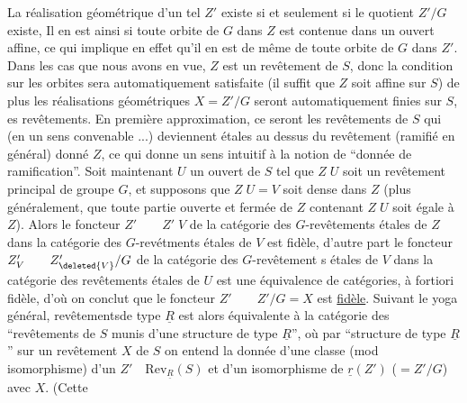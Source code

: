 La réalisation géométrique d'un tel $Z'$ existe si et seulement si le quotient $Z'/G$ existe,  Il en est ainsi si toute orbite de $G$ dans $Z$ est contenue dans un ouvert affine, ce qui implique en effet qu'il en est de même de toute orbite de $G$ dans $Z'$.  Dans les cas que nous avons en vue, $Z$ est un revêtement de $S$, donc la condition sur les orbites sera automatiquement satisfaite (il suffit que $Z$ soit affine sur $S$) de plus les réalisations géométriques $X=Z'/G$ seront automatiquement finies sur $S$,  es revêtements. En première approximation, ce seront les revêtements de $S$ qui (en  un sens convenable ...) deviennent étales au dessus du revêtement (ramifié en général) donné $Z$, ce qui donne un sens intuitif à la notion de ``donnée de ramification''. Soit maintenant $U$ un ouvert de $S$ tel que $Z\;U$ soit un revêtement principal de groupe $G$, et supposons que $Z\;U=V$ soit dense dans $Z$ (plus généralement, que toute partie ouverte et fermée de $Z$ contenant $Z\;U$  soit égale à $Z$). Alors le foncteur $Z'\qquad Z'\;V$ de la catégorie des $G$-revêtements étales de $Z$ dans la catégorie des $G$-revétments étales de $V$ est fidèle, d'autre part le foncteur $Z'_V\qquad Z'_{\deleted{V}}/G$ de la catégorie des $G$-revêtement s étales de $V$ dans la catégorie des revêtements étales de $U$ est une équivalence de catégories, à fortiori fidèle, d'où on conclut que le foncteur  $Z'\qquad Z'/G=X$ est \uline{fidèle}. Suivant le yoga général,  revêtementsde type $\underline{R}$  est alors équivalente à la catégorie des ``revêtements de $S$ munis d'une structure de type $\underline{R}$'', où par ``structure de type $\underline{R}$'' sur un revêtement $X$ de $S$ on entend la donnée d'une classe (mod isomorphisme) d'un $Z'\quad\mathrm{Rev}_{\underline{R}}(S)$ et d'un isomorphisme de $\underline{r}(Z')$ ($=Z'/G$) avec $X$. (Cette
